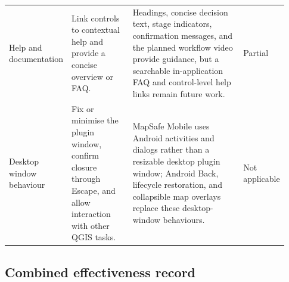 \documentclass[]{interact}
\begin{document}
{\begin{longtable}{@{}p{0.16\linewidth}p{0.22\linewidth}p{0.40\linewidth}p{0.15\linewidth}@{}}
Help and documentation & Link controls to contextual help and provide a concise overview or FAQ. & Headings, concise decision text, stage indicators, confirmation messages, and the planned workflow video provide guidance, but a searchable in-application FAQ and control-level help links remain future work. & Partial \\

Desktop window behaviour & Fix or minimise the plugin window, confirm closure through Escape, and allow interaction with other QGIS tasks. & MapSafe Mobile uses Android activities and dialogs rather than a resizable desktop plugin window; Android Back, lifecycle restoration, and collapsible map overlays replace these desktop-window behaviours. & Not applicable \\
\end{longtable}
}

\subsection*{Combined effectiveness record}
\end{document}
